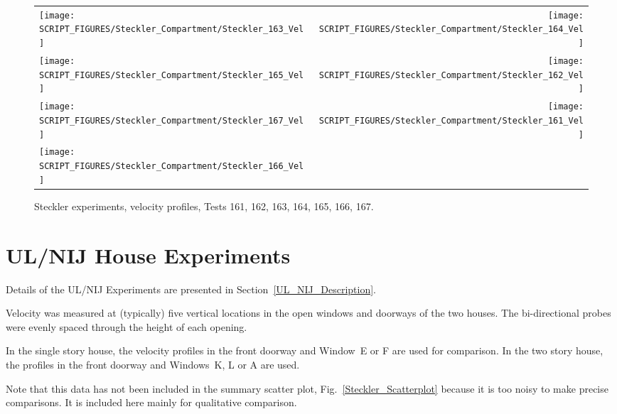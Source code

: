 \begin{figure}[p]
\begin{tabular*}{\textwidth}{l@{\extracolsep{\fill}}r}
\texttt{[image: SCRIPT\_FIGURES/Steckler\_Compartment/Steckler\_163\_Vel]} &
\texttt{[image: SCRIPT\_FIGURES/Steckler\_Compartment/Steckler\_164\_Vel]} \\
\texttt{[image: SCRIPT\_FIGURES/Steckler\_Compartment/Steckler\_165\_Vel]} &
\texttt{[image: SCRIPT\_FIGURES/Steckler\_Compartment/Steckler\_162\_Vel]} \\
\texttt{[image: SCRIPT\_FIGURES/Steckler\_Compartment/Steckler\_167\_Vel]} &
\texttt{[image: SCRIPT\_FIGURES/Steckler\_Compartment/Steckler\_161\_Vel]} \\
\texttt{[image: SCRIPT\_FIGURES/Steckler\_Compartment/Steckler\_166\_Vel]} &
\end{tabular*}
\caption[Steckler experiments, velocity profiles, Tests 161, 162, 163, 164, 165, 166, 167]{Steckler experiments, velocity profiles, Tests 161, 162, 163, 164, 165, 166, 167.}
\label{Steckler_Vel_7}
\end{figure}


\clearpage

\section{UL/NIJ House Experiments}

Details of the UL/NIJ Experiments are presented in Section~\ref{UL_NIJ_Description}.

Velocity was measured at (typically) five vertical locations in the open windows and doorways of the two houses. The bi-directional probes were evenly spaced through the height of each opening.

In the single story house, the velocity profiles in the front doorway and Window~E or F are used for comparison. In the two story house, the profiles in the front doorway and Windows~K, L or A are used.

Note that this data has not been included in the summary scatter plot, Fig.~\ref{Steckler_Scatterplot} because it is too noisy to make precise comparisons. It is included here mainly for qualitative comparison.

